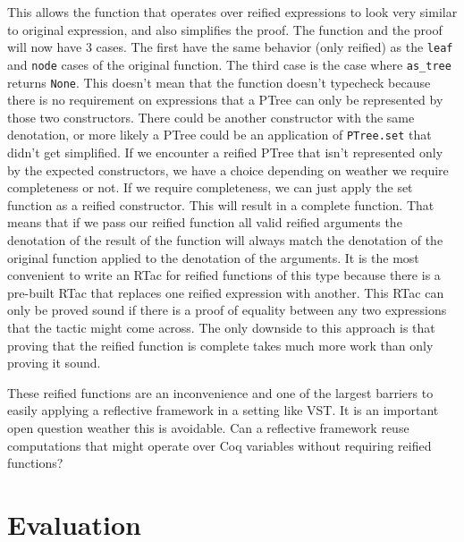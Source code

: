 \documentclass{puthesis}
\begin{document}
This allows the function that operates over reified expressions to look very
similar to original expression, and also simplifies the proof. The function
and the proof will now have 3 cases. The first have the same behavior (only reified)
as the \lstinline|leaf| and \lstinline|node| cases of the original function. The third
case is the case where \lstinline|as_tree| returns \lstinline|None|. This doesn't
mean that the function doesn't typecheck because there is no requirement on 
expressions that a PTree can only be represented by those two constructors. There
could be another constructor with the same denotation, or more likely a PTree
could be an application of \lstinline|PTree.set| that didn't get simplified.
If we encounter a reified PTree that isn't represented
only by the expected constructors, we have a choice depending on
weather we require completeness or not. If we require completeness,
we can just apply the set function as a reified constructor. This
will result in a complete function. That means that if we
pass our reified function all valid reified arguments
the denotation of the result of the function will always
match the denotation of the original function applied
to the denotation of the arguments. It is the most convenient
to write an RTac for reified functions of this type because
there is a pre-built RTac that replaces one reified expression
with another. This RTac can only be proved sound if there is a proof
of equality between any two expressions that the tactic might come
across. The only downside to this approach is that proving that the
reified function is complete takes much more work than only proving it
sound. 

These reified functions are an inconvenience and one of the largest
barriers to easily applying a reflective framework in a setting like
VST. It is an important open question weather this is avoidable. Can
a reflective framework reuse computations that might operate
over Coq variables without requiring reified functions? 


\chapter{Evaluation}
\end{document}
